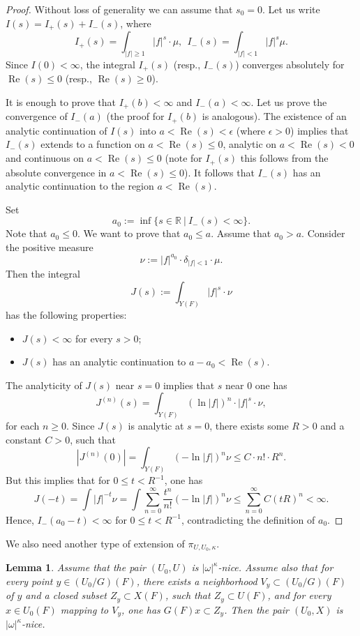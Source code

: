 \documentclass[12pt,reqno]{amsart}
\newtheorem{lemma}[theorem]{Lemma}
\theoremstyle{definition}
\theoremstyle{remark}
\numberwithin{equation}{section}
\renewcommand{\SS}{{\mathcal S}}
\newcommand{\de}{\delta}
\newcommand{\sub}{\subset}
\newcommand{\om}{\omega}
\renewcommand{\Re}{{\operatorname{Re}}}
\newcommand{\eps}{\epsilon}
\newcommand{\R}{{\mathbb R}}
\begin{document}
\begin{proof} Without loss of generality we can assume that $s_0=0$. Let us write $I(s)=I_+(s)+I_-(s)$, where
$$I_+(s)=\int_{|f|\ge 1}|f|^s\cdot \mu, \ \ I_-(s)=\int_{|f|<1}|f|^s \mu.$$
Since $I(0)<\infty$, the integral $I_+(s)$ (resp., $I_-(s)$) converges absolutely for $\Re(s)\le 0$ (resp., $\Re(s)\ge 0$).

It is enough to prove that $I_+(b)<\infty$ and $I_-(a)<\infty$. Let us prove the convergence of $I_-(a)$ (the proof for $I_+(b)$ is analogous).
The existence of an analytic continuation of $I(s)$ into $a<\Re(s)<\eps$ (where $\eps>0$) implies that $I_-(s)$ extends to a function on $a<\Re(s)\le 0$,
analytic on $a<\Re(s)<0$ and continuous on $a<\Re(s)\le 0$ (note for $I_+(s)$ this follows from the absolute convergence in $a<\Re(s)\le 0$).
It follows that $I_-(s)$ has an analytic continuation to the region $a<\Re(s)$.

Set
$$a_0:=\inf\{ s\in \R \ |\ I_-(s)<\infty\}.$$
Note that $a_0\le 0$.
We want to prove that $a_0\le a$. Assume that $a_0>a$. Consider the positive measure
$$\nu:=|f|^{a_0}\cdot \de_{|f|<1}\cdot \mu.$$
Then the integral
$$J(s):=\int_{Y(F)}|f|^s\cdot\nu$$
has the following properties:
\begin{itemize}
\item $J(s)<\infty$ for every $s>0$;
\item $J(s)$ has an analytic continuation to $a-a_0<\Re(s)$.
\end{itemize}
The analyticity of $J(s)$ near $s=0$ implies that $s$ near $0$ one has
$$J^{(n)}(s)=\int_{Y(F)}(\ln |f|)^n\cdot |f|^s\cdot\nu,$$
for each $n\ge 0$. Since $J(s)$ is analytic at $s=0$, there exists some $R>0$ and a constant $C>0$, such that
$$|J^{(n)}(0)|=\int_{Y(F)}(-\ln |f|)^n \nu\le C\cdot n!\cdot R^n.$$
But this implies that for $0\le t<R^{-1}$, one has
$$J(-t)=\int |f|^{-t} \nu=\int \sum_{n=0}^\infty \frac{t^n}{n!}(-\ln |f|)^n \nu\le \sum_{n=0}^\infty C (tR)^n<\infty.$$
Hence, $I_-(a_0-t)<\infty$ for $0\le t<R^{-1}$, contradicting the definition of $a_0$.
\end{proof}

We also need another type of extension of $\pi_{U,U_0,\kappa}$.

\begin{lemma}\label{extension-lem2}
Assume that the pair $(U_0,U)$ is $|\om|^{\kappa}$-nice.
Assume also that for every point $y\in (U_0/G)(F)$, there exists a neighborhood $V_y\sub (U_0/G)(F)$ of $y$ and
a closed subset $Z_y\sub X(F)$, such that $Z_y\sub U(F)$, and
for every $x\in U_0(F)$ mapping to $V_y$, one has $G(F)x\sub Z_y$.
Then the pair $(U_0,X)$ is $|\om|^{\kappa}$-nice.
\end{lemma}
\end{document}
